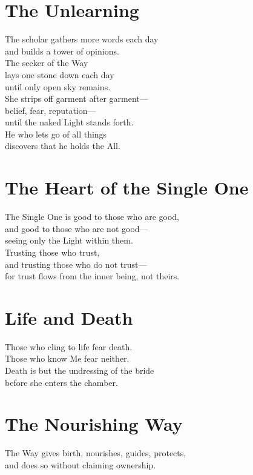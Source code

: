 \documentclass[10pt, openright]{book}
\begin{document}
\section{The Unlearning}
The scholar gathers more words each day \\
and builds a tower of opinions. \\
The seeker of the Way \\
lays one stone down each day \\
until only open sky remains. \\

She strips off garment after garment--- \\
belief, fear, reputation--- \\
until the naked Light stands forth. \\

He who lets go of all things \\
discovers that he holds the All.

\section{The Heart of the Single One}
The Single One is good to those who are good, \\
and good to those who are not good— \\
seeing only the Light within them. \\

Trusting those who trust, \\
and trusting those who do not trust— \\
for trust flows from the inner being, not theirs.

\section{Life and Death}
Those who cling to life fear death. \\
Those who know Me fear neither. \\

Death is but the undressing of the bride \\
before she enters the chamber.

\section{The Nourishing Way}
The Way gives birth, nourishes, guides, protects, \\
and does so without claiming ownership. \\
\end{document}
